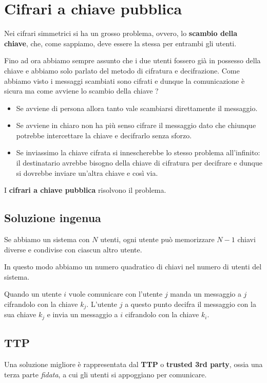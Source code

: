 \chapter{Cifrari a chiave pubblica}
Nei cifrari simmetrici si ha un grosso problema, ovvero, lo \textbf{scambio della chiave}, che, come sappiamo, deve
essere la stessa per entrambi gli utenti.

Fino ad ora abbiamo sempre assunto che i due utenti fossero gi\`a in possesso della chiave e abbiamo solo parlato del
metodo di cifratura e decifrazione. Come abbiamo visto i messaggi scambiati sono cifrati e dunque la comunicazione \`e
sicura ma come avviene lo scambio della chiave ?
\begin{itemize}
	\item Se avviene di persona allora tanto vale scambiarsi direttamente il messaggio.
	\item Se avviene in chiaro non ha pi\`u senso cifrare il messaggio dato che chiunque potrebbe intercettare la
	      chiave e decifrarlo senza sforzo.
	\item Se inviassimo la chiave cifrata si innescherebbe lo stesso problema all'infinito: il destinatario avrebbe
	      bisogno della chiave di cifratura per decifrare e dunque si dovrebbe inviare un'altra chiave e cos\`i via.
\end{itemize}
I \textbf{cifrari a chiave pubblica} risolvono il problema.

\section{Soluzione ingenua}
Se abbiamo un sistema con $N$ utenti, ogni utente pu\`o memorizzare $N-1$ chiavi diverse e condivise con ciascun altro
utente.

In questo modo abbiamo un numero quadratico di chiavi nel numero di utenti del sistema.

Quando un utente $i$ vuole comunicare con l'utente $j$ manda un messaggio a $j$ cifrandolo con la chiave $k_j$. L'utente
$j$ a questo punto decifra il messaggio con la sua chiave $k_j$ e invia un messaggio a $i$ cifrandolo con la chiave $k_i$.

\section{TTP}
Una soluzione migliore \`e rappresentata dal \textbf{TTP} o \textbf{trusted 3rd party}, ossia una terza parte
\emph{fidata}, a cui gli utenti si appoggiano per comunicare.

